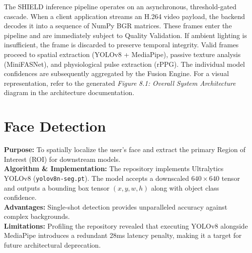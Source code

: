 \documentclass[12pt, a4paper]{report}
\begin{document}
\vspace{1em}
The SHIELD inference pipeline operates on an asynchronous, threshold-gated cascade. When a client application streams an H.264 video payload, the backend decodes it into a sequence of NumPy BGR matrices. These frames enter the pipeline and are immediately subject to Quality Validation. If ambient lighting is insufficient, the frame is discarded to preserve temporal integrity. Valid frames proceed to spatial extraction (YOLOv8 + MediaPipe), passive texture analysis (MiniFASNet), and physiological pulse extraction (rPPG). The individual model confidences are subsequently aggregated by the Fusion Engine. For a visual representation, refer to the generated \textit{Figure 8.1: Overall System Architecture} diagram in the architecture documentation.

\section{Face Detection}
\textbf{Purpose:} To spatially localize the user's face and extract the primary Region of Interest (ROI) for downstream models. \\
\textbf{Algorithm \& Implementation:} The repository implements Ultralytics YOLOv8 (\texttt{yolov8n-seg.pt}). The model accepts a downscaled $640 \times 640$ tensor and outputs a bounding box tensor $(x, y, w, h)$ along with object class confidence. \\
\textbf{Advantages:} Single-shot detection provides unparalleled accuracy against complex backgrounds. \\
\textbf{Limitations:} Profiling the repository revealed that executing YOLOv8 alongside MediaPipe introduces a redundant 28ms latency penalty, making it a target for future architectural deprecation.
\end{document}
